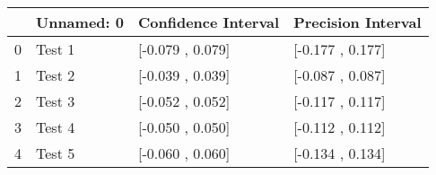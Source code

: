 \begin{tabular}{llll}
\toprule
{} & Unnamed: 0 & Confidence Interval &  Precision Interval \\
\midrule
0 &     Test 1 &    [-0.079 , 0.079] &    [-0.177 , 0.177] \\
1 &     Test 2 &    [-0.039 , 0.039] &    [-0.087 , 0.087] \\
2 &     Test 3 &    [-0.052 , 0.052] &    [-0.117 , 0.117] \\
3 &     Test 4 &    [-0.050 , 0.050] &    [-0.112 , 0.112] \\
4 &     Test 5 &    [-0.060 , 0.060] &    [-0.134 , 0.134] \\
\bottomrule
\end{tabular}
